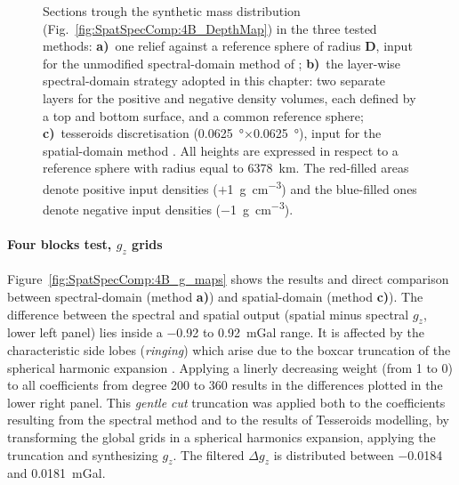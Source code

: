 \begin{subappendices}
\begin{figure} %
    \begin{adjustbox}{center}
    \end{adjustbox}
    \caption[Sections trough the synthetic mass distribution in the three tested modelling methods]{
        Sections trough the synthetic mass distribution (Fig.~\ref{fig:SpatSpecComp:4B_DepthMap}) in the three tested methods:
        \textbf{a)}~one relief against a reference sphere of radius $\bm{D}$, input for the unmodified spectral-domain method of \textcite{Wieczorek2007};
        \textbf{b)}~the layer-wise spectral-domain strategy adopted in this chapter: two separate layers for the positive and negative density volumes, each defined by a top and bottom surface, and a common reference sphere;
        \textbf{c)}~tesseroids discretisation (\SI{0.0625}{\degree}$\times$\SI{0.0625}{\degree}), input for the spatial-domain method \parencite{Uieda2016}.
        All heights are expressed in respect to a reference sphere with radius equal to \SI{6378}{\kilo \metre}.
        The red-filled areas denote positive input densities ($+$\SI{1}{\gram \per \cubic \centi \metre}) and the blue-filled ones denote negative input densities (\SI{-1}{\gram \per \cubic \centi \metre}).}
    \label{fig:SpatSpecComp:4B_sections}
\end{figure}

\paragraph*{Four blocks test, $g_z$ grids}
Figure~\ref{fig:SpatSpecComp:4B_g_maps} shows the results and direct comparison between spectral-domain (method \textbf{a)}) and spatial-domain (method \textbf{c)}).
The difference between the spectral and spatial output (spatial minus spectral $g_z$, lower left panel) lies inside a \num{-0.92} to \SI{0.92}{\milli Gal} range.
It is affected by the characteristic side lobes (\textit{ringing}) which arise due to the boxcar truncation of the spherical harmonic expansion \parencite{BarthelmesGentleCut2008}.
Applying a linerly decreasing weight (from 1 to 0) to all coefficients from degree 200 to 360 results in the differences plotted in the lower right panel.
This \textit{gentle cut} truncation was applied both to the coefficients resulting from the spectral method and to the results of Tesseroids modelling, by transforming the global grids in a spherical harmonics expansion, applying the truncation and synthesizing $g_z$.
The filtered $\Delta g_z$ is distributed between \num{-0.0184} and \SI{0.0181}{\milli Gal}.


\end{subappendices}

